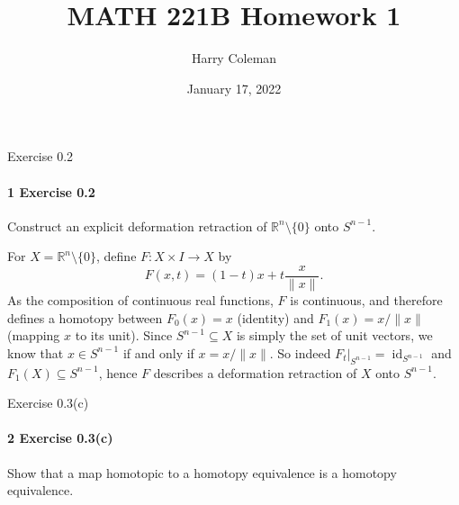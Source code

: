 \documentclass[12pt]{article}
\renewcommand{\maketitle}{\thispagestyle{title}}
\newlength{\myparskip}
\newenvironment{fullbox}{\begin{lrbox}{\savefullbox}\begin{minipage}{\dimexpr\textwidth-2\fboxsep\relax}\setlength{\parskip}{\myparskip}}{\end{minipage}\end{lrbox}\framebox[\textwidth]{\usebox{\savefullbox}}}
\newenvironment{pbox}[1][]{\begin{fullbox}\ifx#1\empty\else\paragraph{#1}\phantom{}\fi}{\end{fullbox}}
\theoremstyle{definition}
\newcommand{\R}{\mathbb{R}}
\newcommand{\<}{\langle}
\renewcommand{\>}{\rangle}
\DeclareMathOperator{\id}{id}
\begin{document}
\title{MATH 221B Homework 1}
\author{Harry Coleman}
\date{January 17, 2022}
\maketitle

\begin{pbox}[1 Exercise 0.2]
    Construct an explicit deformation retraction of $\R^n \setminus \{0\}$ onto $S^{n-1}$.
\end{pbox}

For $X = \R^n \setminus \{0\}$, define $F : X \times I \to X$ by
\[
    F(x, t) = (1 - t)x + t\frac{x}{\|x\|}.
\]
As the composition of continuous real functions, $F$ is continuous, and therefore defines a homotopy between $F_0(x) = x$ (identity) and $F_1(x) = x/\|x\|$ (mapping $x$ to its unit).
Since $S^{n-1} \subseteq X$ is simply the set of unit vectors, we know that $x \in S^{n-1}$ if and only if $x = x/\|x\|$.
So indeed $F_t|_{S^{n-1}} = \id_{S^{n-1}}$ and $F_1(X) \subseteq S^{n-1}$, hence $F$ describes a deformation retraction of $X$ onto $S^{n-1}$.



\newpage
\begin{pbox}[2 Exercise 0.3(c)]
    Show that a map homotopic to a homotopy equivalence is a homotopy equivalence. 
\end{pbox}
\end{document}
